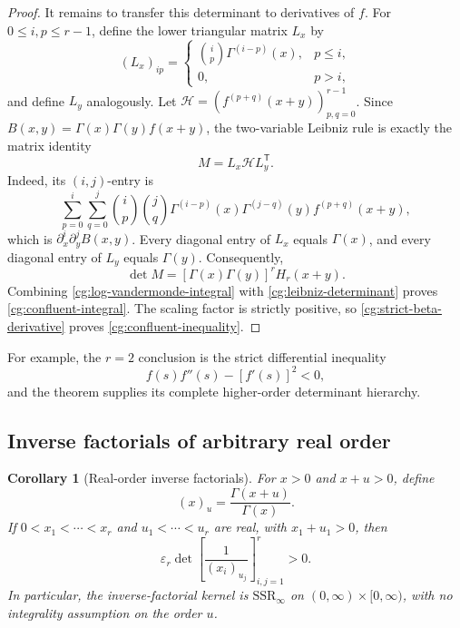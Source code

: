 \documentclass[11pt,a4paper]{article}
\newtheorem{corollary}[theorem]{Corollary}
\theoremstyle{definition}
\theoremstyle{remark}
\newcommand{\ep}{\varepsilon}
\newcommand{\SSR}{\mathrm{SSR}}
\begin{document}
\begin{proof}
It remains to transfer this determinant to derivatives of \(f\).
For \(0\le i,p\le r-1\), define the lower triangular matrix \(L_x\) by
\[
 (L_x)_{ip}=
 \begin{cases}
  \displaystyle\binom{i}{p}\Gamma^{(i-p)}(x),&p\le i,\\
  0,&p>i,
 \end{cases}
\]
and define \(L_y\) analogously. Let
\(\mathcal H=(f^{(p+q)}(x+y))_{p,q=0}^{r-1}\).
Since \(B(x,y)=\Gamma(x)\Gamma(y)f(x+y)\), the two-variable Leibniz
rule is exactly the matrix identity
\begin{equation}\label{cg:leibniz}
 M=L_x\mathcal H L_y^{\mathsf T}.
\end{equation}
Indeed, its \((i,j)\)-entry is
\[
 \sum_{p=0}^{i}\sum_{q=0}^{j}
 \binom{i}{p}\binom{j}{q}
 \Gamma^{(i-p)}(x)\Gamma^{(j-q)}(y)
 f^{(p+q)}(x+y),
\]
which is \(\partial_x^i\partial_y^j B(x,y)\).
Every diagonal entry of \(L_x\) equals \(\Gamma(x)\), and every
diagonal entry of \(L_y\) equals \(\Gamma(y)\). Consequently,
\begin{equation}\label{cg:leibniz-determinant}
 \det M=[\Gamma(x)\Gamma(y)]^r H_r(x+y).
\end{equation}
Combining \eqref{cg:log-vandermonde-integral} with
\eqref{cg:leibniz-determinant} proves
\eqref{cg:confluent-integral}. The scaling factor is strictly positive,
so \eqref{cg:strict-beta-derivative} proves
\eqref{cg:confluent-inequality}.
\end{proof}

For example, the \(r=2\) conclusion is the strict differential
inequality
\[
 f(s)f''(s)-[f'(s)]^2<0,
\]
and the theorem supplies its complete higher-order determinant hierarchy.

\subsection{Inverse factorials of arbitrary real order}

\begin{corollary}[Real-order inverse factorials]\label{cg:inverse-factorial}
For \(x>0\) and \(x+u>0\), define
\[
 (x)_u=\frac{\Gamma(x+u)}{\Gamma(x)}.
\]
If \(0<x_1<\cdots<x_r\) and \(u_1<\cdots<u_r\) are real, with
\(x_1+u_1>0\), then
\begin{equation}\label{cg:inverse-factorial-inequality}
 \ep_r\det\left[\frac1{(x_i)_{u_j}}\right]_{i,j=1}^{r}>0.
\end{equation}
In particular, the inverse-factorial kernel is \(\SSR_\infty\) on
\((0,\infty)\times[0,\infty)\), with no integrality assumption on the
order \(u\).
\end{corollary}
\end{document}
